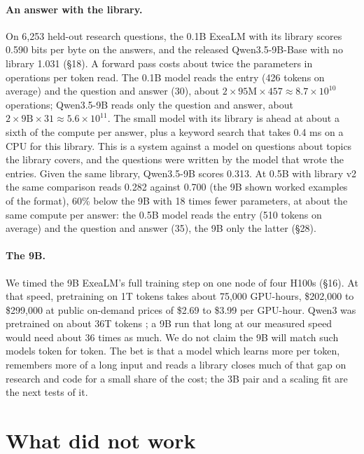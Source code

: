 \documentclass[10pt,twocolumn,letterpaper]{article}
\newcommand{\sect}[1]{\S#1}
\begin{document}
\paragraph{An answer with the library.}
On 6,253 held-out research questions, the 0.1B ExeaLM with its library scores 0.590 bits per byte on the answers, and the released Qwen3.5-9B-Base with no library 1.031 (\sect{18}).
A forward pass costs about twice the parameters in operations per token read.
The 0.1B model reads the entry (426 tokens on average) and the question and answer (30), about $2 \times 95\textrm{M} \times 457 \approx 8.7\times10^{10}$ operations; Qwen3.5-9B reads only the question and answer, about $2 \times 9\textrm{B} \times 31 \approx 5.6\times10^{11}$.
The small model with its library is ahead at about a sixth of the compute per answer, plus a keyword search that takes 0.4 ms on a CPU for this library.
This is a system against a model on questions about topics the library covers, and the questions were written by the model that wrote the entries.
Given the same library, Qwen3.5-9B scores 0.313.
At 0.5B with library v2 the same comparison reads 0.282 against 0.700 (the 9B shown worked examples of the format), 60\% below the 9B with 18 times fewer parameters, at about the same compute per answer: the 0.5B model reads the entry (510 tokens on average) and the question and answer (35), the 9B only the latter (\sect{28}).

\paragraph{The 9B.}
We timed the 9B ExeaLM's full training step on one node of four H100s (\sect{16}).
At that speed, pretraining on 1T tokens takes about 75,000 GPU-hours, \$202,000 to \$299,000 at public on-demand prices of \$2.69 to \$3.99 per GPU-hour.
Qwen3 was pretrained on about 36T tokens \citep{yang2025qwen3}; a 9B run that long at our measured speed would need about 36 times as much.
We do not claim the 9B will match such models token for token.
The bet is that a model which learns more per token, remembers more of a long input and reads a library closes much of that gap on research and code for a small share of the cost; the 3B pair and a scaling fit are the next tests of it.

\section{What did not work}
\label{sec:negative}
\end{document}
